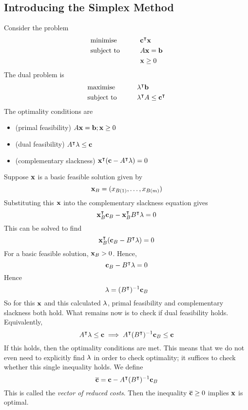\subsection{Introducing the Simplex Method}
Consider the problem
\begin{alignat*}{2}
	 & \text{minimise}   & \qquad & \vb c^\intercal \vb x \\
	 & \text{subject to} &        & A \vb x = \vb b        \\
	 &                   &        & \vb x \geq 0
\end{alignat*}
The dual problem is
\begin{alignat*}{2}
	 & \text{maximise}   & \qquad & \vb \lambda^\intercal \vb b                   \\
	 & \text{subject to} &        & \vb \lambda^\intercal A \leq \vb c^\intercal \\
\end{alignat*}
The optimality conditions are
\begin{itemize}
	\item (primal feasibility) \( A \vb x = \vb b; \vb x \geq 0 \)
	\item (dual feasibility) \( A^\intercal \vb \lambda \leq \vb c \)
	\item (complementary slackness) \( \vb x^\intercal (\vb c - A^\intercal \vb \lambda) = 0 \)
\end{itemize}
Suppose \( \vb x \) is a basic feasible solution given by
\[
	\vb x_B = (x_{B(1)}, \dots, x_{B(m)})
\]
Substituting this \( \vb x \) into the complementary slackness equation gives
\[
	\vb x_B^\intercal \vb c_B - \vb x_B^\intercal B^\intercal \vb \lambda = 0
\]
This can be solved to find
\[
	\vb x_B^\intercal (\vb c_B - B^\intercal \vb \lambda) = 0
\]
For a basic feasible solution, \( \vb x_B > 0 \).
Hence,
\[
	\vb c_B - B^\intercal \vb \lambda = 0
\]
Hence
\[
	\vb \lambda = (B^\intercal)^{-1} \vb c_B
\]
So for this \( \vb x \) and this calculated \( \vb \lambda \), primal feasibility and complementary slackness both hold.
What remains now is to check if dual feasibility holds.
Equivalently,
\[
	A^\intercal \vb \lambda \leq \vb c \implies A^\intercal (B^\intercal)^{-1} \vb c_B \leq \vb c
\]
If this holds, then the optimality conditions are met.
This means that we do not even need to explicitly find \( \vb \lambda \) in order to check optimality; it suffices to check whether this single inequality holds.
We define
\[
	\overline{\vb c} = \vb c - A^\intercal (B^\intercal)^{-1} \vb c_B
\]
This is called the \textit{vector of reduced costs}.
Then the inequality \( \overline{\vb c} \geq 0 \) implies \( \vb x \) is optimal.
